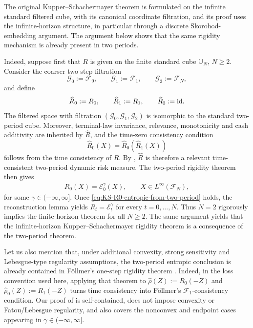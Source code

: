 \documentclass[a4paper]{amsart}
\theoremstyle{definition}
\newcommand{\F}{\mathcal{F}}
\newcommand{\G}{\mathcal{G}}
\newcommand{\id}{\textup{id}}
\begin{document}

The original Kupper--Schachermayer theorem is formulated on the infinite
standard filtered cube, with its canonical coordinate filtration, and its proof
uses the infinite-horizon structure, in particular through a discrete
Skorohod-embedding argument. The argument below shows that the same rigidity
mechanism is already present in two periods.




Indeed, suppose first that \(R\) is given on the finite standard cube
\(\mathbb U_N\), \(N\ge2\). Consider the coarser two-step filtration
\[
\G_0:=\F_0,\qquad
\G_1:=\F_1,\qquad
\G_2:=\F_N,
\]
and define
\[
\widehat R_0:=R_0,\qquad
\widehat R_1:=R_1,\qquad
\widehat R_2:=\id .
\]
The filtered space with filtration \((\G_0,\G_1,\G_2)\) is isomorphic to the
standard two-period cube. Moreover, terminal-law invariance, relevance,
monotonicity and cash additivity are inherited by \(\widehat R\), and the
time-zero consistency condition
\[
\widehat R_0(X)=\widehat R_0(\widehat R_1(X))
\]
follows from the time consistency of \(R\). By
, \(\widehat R\) is therefore a
relevant time-consistent two-period dynamic risk measure. The two-period
rigidity theorem then gives
\begin{align}
R_0(X)=\mathcal E_0^\gamma(X),
\qquad
X\in L^\infty(\F_N),
\label{eq:KS-R0-entropic-from-two-period}
\end{align}
for some \(\gamma\in(-\infty,\infty]\). Once
\eqref{eq:KS-R0-entropic-from-two-period} holds, the reconstruction lemma
yields \(R_t=\mathcal E_t^\gamma\) for every \(t=0,\dots,N\). Thus \(N=2\)
rigorously implies the finite-horizon theorem for all \(N\ge2\). The same
argument yields that the infinite-horizon Kupper--Schachermayer rigidity
theorem is a consequence of the two-period theorem.

Let us also mention that, under additional convexity, strong sensitivity and
Lebesgue-type regularity assumptions, the two-period entropic conclusion is
already contained in Föllmer's one-step rigidity theorem
\cite[Theorem~3.4]{Follmer2014Spatial}. Indeed, in the loss convention used
here, applying that theorem to
\(\widehat\rho(Z):=R_0(-Z)\) and
\(\widehat\rho_0(Z):=R_1(-Z)\) turns time consistency into Föllmer's
\(\mathcal F_1\)-consistency condition. Our proof of  is self-contained,
does not impose convexity or Fatou/Lebesgue regularity, and also covers the
nonconvex and endpoint cases appearing in \(\gamma\in(-\infty,\infty]\).
\end{document}
